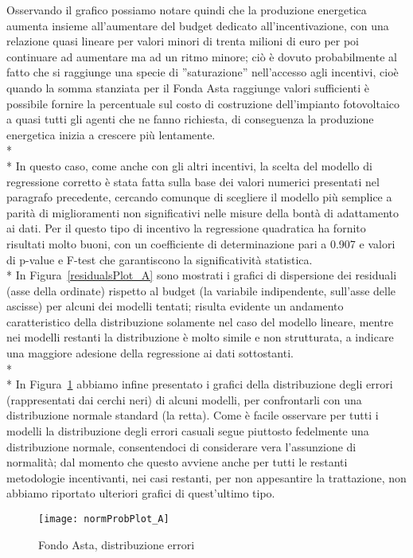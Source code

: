 \documentclass[12pt,a4paper,openright,twoside]{report}
\begin{document}
Osservando il grafico possiamo notare quindi che la produzione energetica aumenta insieme all'aumentare del budget dedicato all'incentivazione, con una relazione quasi lineare per valori minori di trenta milioni di euro per poi continuare ad aumentare ma ad un ritmo minore; ciò è dovuto probabilmente al fatto che si raggiunge una specie di ''saturazione'' nell'accesso agli incentivi, cioè quando la somma stanziata per il Fonda Asta raggiunge valori sufficienti è possibile fornire la percentuale sul costo di costruzione dell'impianto fotovoltaico a quasi tutti gli agenti che ne fanno richiesta, di conseguenza la produzione energetica inizia a crescere più lentamente.\\* \\*
In questo caso, come anche con gli altri incentivi, la scelta del modello di regressione corretto è stata fatta sulla base dei valori numerici presentati nel paragrafo precedente, cercando comunque di scegliere il modello più semplice a parità di miglioramenti non significativi nelle misure della bontà di adattamento ai dati. Per il questo tipo di incentivo la regressione quadratica ha fornito risultati molto buoni, con un coefficiente di determinazione pari a 0.907 e valori di p-value e F-test che garantiscono la significatività statistica.\\*
In Figura~\ref{residualsPlot_A} sono mostrati i grafici di dispersione dei residuali (asse della ordinate) rispetto al budget (la variabile indipendente, sull'asse delle ascisse) per alcuni dei modelli tentati; risulta evidente un andamento caratteristico della distribuzione solamente nel caso del modello lineare, mentre nei modelli restanti la distribuzione è molto simile e non strutturata, a indicare una maggiore adesione della regressione ai dati sottostanti.\\* \\*
In Figura~\ref{normProbPlot_A} abbiamo infine presentato i grafici della distribuzione degli errori (rappresentati dai cerchi neri) di alcuni modelli, per confrontarli con una distribuzione normale standard (la retta). Come è facile osservare per tutti i modelli la distribuzione degli errori casuali segue piuttosto fedelmente una distribuzione normale, consentendoci di considerare vera l'assunzione di normalità; dal momento che questo avviene anche per tutti le restanti metodologie incentivanti, nei casi restanti, per non appesantire la trattazione, non abbiamo riportato ulteriori grafici di quest'ultimo tipo. 

\begin{figure}[H]
	\centering
	\texttt{[image: normProbPlot\_A]}
	\caption{Fondo Asta, distribuzione errori}
	\label{normProbPlot_A}
\end{figure}
\end{document}

